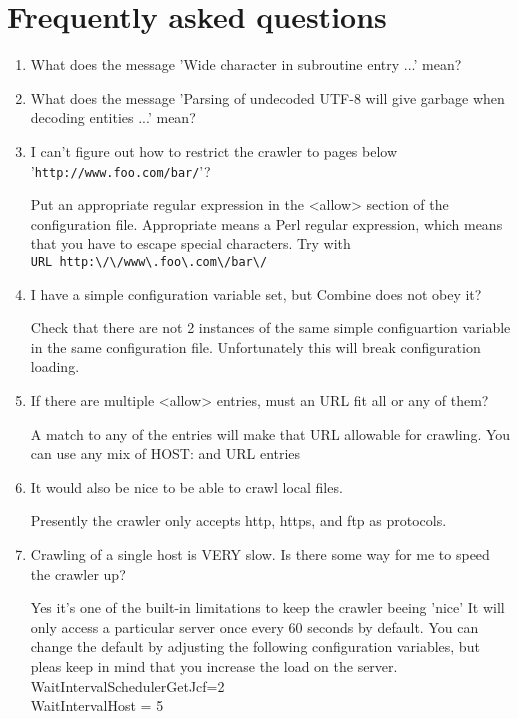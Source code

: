 \section{Frequently asked questions}
\begin{enumerate}
\item What does the message 'Wide character in subroutine entry ...' mean?


\item What does the message 'Parsing of undecoded UTF-8 will give garbage when decoding entities ...' mean?

\item I can't figure out how to restrict the crawler to pages below
'{\tt http://www.foo.com/bar/}'?

 Put an
appropriate regular expression in the <allow> section of the configuration
file. Appropriate means
a Perl regular expression, which means that you have to escape special
characters. Try with\\
\verb+URL http:\/\/www\.foo\.com\/bar\/+


\item I have a simple configuration variable set, but Combine does not obey it?

Check that there are not 2 instances of the same simple configuartion
variable in the same configuration file. Unfortunately this will break
configuration loading.


\item If there are multiple <allow> entries, must an
URL fit all or any of them?

A match to any of the entries will make that URL allowable for crawling.
You can use any mix of HOST: and URL entries

\item It would also be nice to be able to crawl local files.

Presently the crawler only accepts http, https, and ftp as protocols.

\item Crawling of a single host is VERY slow.
Is there some way for me to speed the crawler up?


Yes it's one of the built-in limitations to keep the crawler beeing 'nice'
It will only access a particular server once every 60 seconds by default. You can change the default by adjusting the following configuration variables, but pleas keep in mind that you increase the load on the server.\\
WaitIntervalSchedulerGetJcf=2\\
WaitIntervalHost = 5\\



\end{enumerate}
